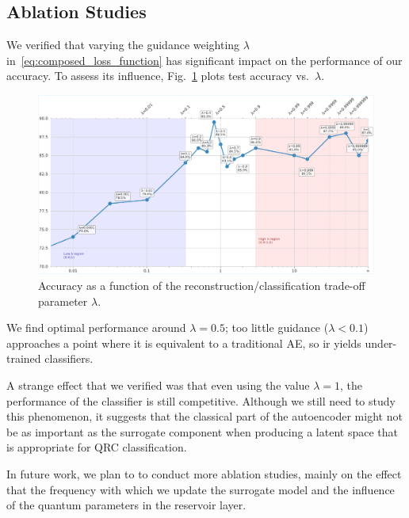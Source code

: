 \documentclass[conference]{IEEEtran}
\begin{document}
\subsection{Ablation Studies}

We verified that varying the guidance weighting $\lambda$ in~\eqref{eq:composed_loss_function} has significant impact on the performance of our accuracy. To assess its influence, Fig.~\ref{fig:lambda_sweep} plots test accuracy vs.\ $\lambda$.

\begin{figure}[tb]
  \centering
  \includegraphics[width=1\linewidth]{images/results/generated_polyp_dataset/guided_lambda_log_mu_effect.pdf}
  \caption{Accuracy as a function of the reconstruction/classification trade-off parameter $\lambda$.}
  \label{fig:lambda_sweep}
\end{figure}

\noindent
We find optimal performance around $\lambda=0.5$; too little guidance ($\lambda<0.1$) approaches a point where it is equivalent to a traditional AE, so ir yields under-trained classifiers. 

A strange effect that we verified was that even using the value \(\lambda = 1\), the performance of the classifier is still competitive. Although we still need to study this phenomenon, it suggests that the classical part of the autoencoder might not be as important as the surrogate component when producing a latent space that is appropriate for QRC classification. 


In future work, we plan to to conduct more ablation studies, mainly on the effect that the frequency with which we update the surrogate model and the influence of the quantum parameters in the reservoir layer.
\end{document}
